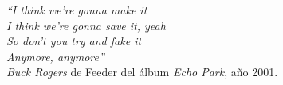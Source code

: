\vspace{1cm}
\begin{flushright}
    \emph{``I think we're gonna make it}\\
    \emph{I think we're gonna save it, yeah}\\
    \emph{So don't you try and fake it}\\
    \emph{Anymore, anymore''}\\
    \textit{Buck Rogers} de Feeder del álbum \textit{Echo Park}, año 2001.
\end{flushright}
